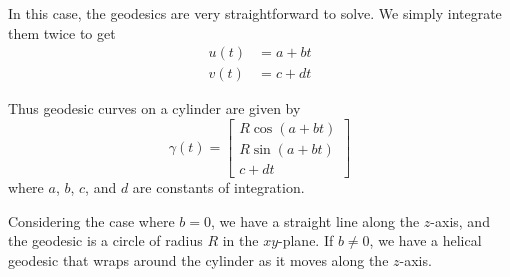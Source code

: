 \documentclass[12pt]{article}
\begin{document}
In this case, the geodesics are very straightforward to solve.
We simply integrate them twice to get
\begin{align*}
	u(t) &= a + b t \\
	v(t) &= c + d t
\end{align*}

Thus geodesic curves on a cylinder are given by 
\[
	\gamma(t) = \begin{bmatrix} R \cos (a + b t) \\ R \sin (a + b t) \\ c + d t \end{bmatrix}
\]
where \(a\), \(b\), \(c\), and \(d\) are constants of integration.

Considering the case where \(b = 0\), we have a straight line along the \(z\)-axis, and the geodesic is a circle of radius \(R\) in the \(xy\)-plane.
If \(b \neq 0\), we have a helical geodesic that wraps around the cylinder as it moves along the \(z\)-axis.
\end{document}
